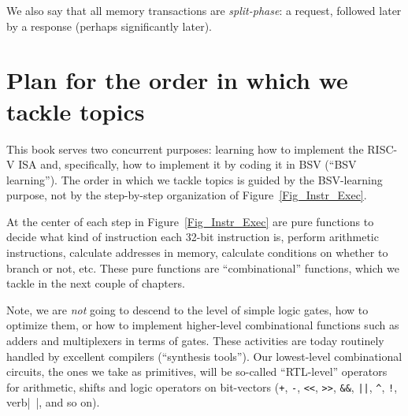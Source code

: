 We also say that all memory transactions are \emph{split-phase}: a
request, followed later by a response (perhaps significantly later).


\section{Plan for the order in which we tackle topics}

This book serves two concurrent purposes: learning how to implement
the RISC-V ISA and, specifically, how to implement it by coding it in
BSV (``BSV learning'').  The order in which we tackle topics is guided
by the BSV-learning purpose, not by the step-by-step organization of
Figure~\ref{Fig_Instr_Exec}.

At the center of each step in Figure~\ref{Fig_Instr_Exec} are pure
functions to decide what kind of instruction each 32-bit instruction
is, perform arithmetic instructions, calculate addresses in memory,
calculate conditions on whether to branch or not, etc.  These pure
functions are ``combinational'' functions, which we tackle in the next
couple of chapters.

Note, we are \emph{not} going to descend to the level of simple logic
gates, how to optimize them, or how to implement higher-level
combinational functions such as adders and multiplexers in terms of
gates.  These activities are today routinely handled by excellent
compilers (``synthesis tools'').  Our lowest-level combinational
circuits, the ones we take as primitives, will be so-called
``RTL-level'' operators for arithmetic, shifts and logic operators on
bit-vectors (\verb|+|, \verb|-|, \verb|<<|, \verb|>>|, \verb|&&|,
\verb'||', \verb|^|, \verb|!|, verb|~|, and so on).


